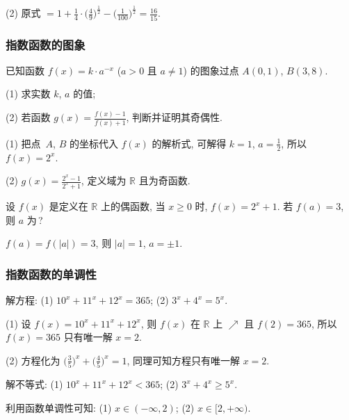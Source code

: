     (2) 原式 $=1+ \frac14\cdot\Big(\frac49\Big)^{\frac12}- \Big(\frac1{100}\Big)^{\frac12}=\frac{16}{15}$.
  \endsolution
  
  \subsubsection{指数函数的图象}
  
  \begin{example}
    已知函数 $f(x)=k\cdot a^{-x}$ ($a>0$ 且 $a\neq1$) 的图象过点 $A(0,1)$, $B(3,8)$.
    
    (1) 求实数 $k$, $a$ 的值;
    
    (2) 若函数 $g(x)= \frac{f(x)-1}{f(x)+1}$, 判断并证明其奇偶性.
  \end{example}

  \beginsolution
    (1) 把点~$A$, $B$ 的坐标代入 $f(x)$ 的解析式, 可解得 $k=1$, $a=\frac12$, 所以 $f(x)=2^x$.
    
    (2) $g(x)= \frac{2^x-1}{2^x+1}$, 定义域为 $\mathbb{R}$ 且为奇函数.
  \endsolution
  
  \lianxi
  \begin{exercise}[s]
    设 $f(x)$ 是定义在 $\mathbb{R}$ 上的偶函数, 
    当 $x\geqslant 0$ 时, $f(x)=2^x +1$.
    若 $f(a)=3$, 则 $a$ 为\,?
  \end{exercise}

  \beginsolution
    $f(a)=f(|a|)=3$, 则 $|a|=1$, $a=\pm1$.
  \endsolution

  \subsubsection{指数函数的单调性}
  
  \begin{example}
    解方程:
    (1) $10^x+11^x+12^x=365$;\quad
    (2) $3^x+4^x=5^x$.
  \end{example}

  \beginsolution
    (1) 设 $f(x)=10^x+11^x+12^x$, 则 $f(x)$ 在 $\mathbb{R}$ 上 $\nearrow$ 且 $f(2)=365$, 所以 $f(x)=365$ 只有唯一解 $x=2$.
    
    (2) 方程化为 $\Big(\frac35\Big)^x+ \Big(\frac45\Big)^x= 1$, 同理可知方程只有唯一解 $x=2$.
    
    \varexercise 解不等式: 
      (1) $10^x+11^x+12^x<365$;\quad
      (2) $3^x+4^x\geqslant 5^x$.
     
    利用函数单调性可知: (1) $x\in(-\infty,2)$; (2) $x\in[2,+\infty)$.
  \endsolution
  
